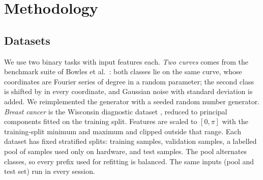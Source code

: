 \section{Methodology}
\label{sec:methods}

\subsection{Datasets}
We use two binary tasks with  input features each. \emph{Two curves} comes from
the benchmark suite of Bowles et al.~\cite{bowles2024benchmarking}: both classes lie on the same
curve, whose coordinates are Fourier series of degree  in a random parameter;
the second class is shifted by  in every coordinate, and Gaussian noise with
standard deviation  is added. We reimplemented the generator with a seeded random
number generator. \emph{Breast cancer} is the Wisconsin diagnostic dataset
\cite{wolberg1993breast}, reduced to  principal components fitted on the training
split. Features are scaled to $[0,\pi]$ with the training-split minimum and maximum and clipped
outside that range. Each dataset has fixed stratified splits:  training samples,
 validation samples, a labelled pool of  samples used only on hardware, and
 test samples. The pool alternates classes, so every prefix used for refitting is
balanced. The same  inputs (pool and test set) run in every session.

